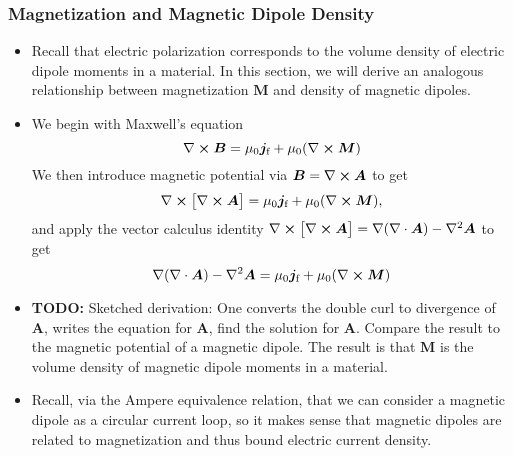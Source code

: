 \documentclass[11pt, a4paper]{article}
\renewcommand{\vec}[1]{\bm{#1}} %
\newcommand{\B}{\vec{B}} %
\newcommand{\A}{\vec{A}} %
\newcommand{\M}{\vec{M}}  %
\newcommand{\mm}{\mu_{0}}  %
\renewcommand{\j}{\vec{j}}  %
\renewcommand{\div}{\nabla \cdot}
\renewcommand{\curl}{\nabla \cross}
\renewcommand{\grad}{\nabla}
\renewcommand{\laplacian}{\nabla^{2}}
\begin{document}
\subsubsection{Magnetization and Magnetic Dipole Density}
\begin{itemize}
	\item Recall that electric polarization corresponds to the volume density of electric dipole moments in a material. In this section, we will derive an analogous relationship between magnetization $ \M $ and density of magnetic dipoles.
	
	\item We begin with Maxwell's equation
	\begin{equation*}
		\curl \B = \mm \j_{\text{f}} + \mm (\curl \M)
	\end{equation*}
	We then introduce magnetic potential via $ \B = \curl \A $ to get
    \begin{equation*}
        \curl \big[ \curl \A \big] = \mm \j_{\text{f}} + \mm (\curl \M),
    \end{equation*}
    and apply the vector calculus identity $ \curl \big[ \curl \A \big] = \grad (\div \A) - \laplacian \A $ to get
    \begin{equation*}
        \grad (\div \A) - \laplacian \A  = \mm \j_{\text{f}} + \mm (\curl \M)
    \end{equation*}
	
	 \item \textbf{TODO:} Sketched derivation: One converts the double curl to divergence of $ \A $, writes the equation for $ \A $, find the solution for $ \A $. Compare the result to the magnetic potential of a magnetic dipole. The result is that $ \M $ is the volume density of magnetic dipole moments in a material.
	
	\item Recall, via the Ampere equivalence relation, that we can consider a magnetic dipole as a circular current loop, so it makes sense that magnetic dipoles are related to magnetization and thus bound electric current density.
	
\end{itemize}
\end{document}
